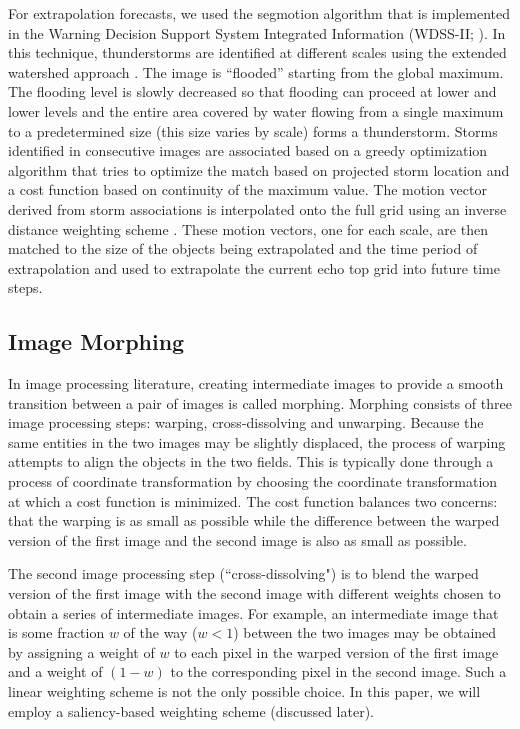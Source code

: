 \documentclass[12pt]{article}
\begin{document}
For extrapolation forecasts, we used the segmotion algorithm that is implemented in the Warning Decision Support System Integrated Information (WDSS-II; \citealt{lak++06}). 
In this technique, thunderstorms are identified at different scales using the extended watershed approach \citep{lak09eff}. The image is ``flooded'' starting from the global maximum. The flooding level is slowly decreased so that flooding can proceed at lower and lower levels and the entire area covered by water flowing from a single maximum to a predetermined size (this size varies by scale) forms a thunderstorm. Storms identified in consecutive images are associated based on a greedy optimization algorithm \citep{lak10object} that tries to optimize the match based on projected storm location and a cost function based on continuity of the maximum value. The motion vector derived from storm associations is interpolated onto the full grid using an inverse distance weighting scheme \citep{lak++03}. These motion vectors, one for each scale, are then matched to the size of the objects being extrapolated and the time period of extrapolation and used to extrapolate the current echo top grid into future time steps.

\subsection{Image Morphing}
In image processing literature, creating intermediate images
to provide a smooth transition between a pair of images is called
morphing. Morphing consists of three image processing steps:
warping, cross-dissolving and unwarping. Because the same entities in the
two images may be slightly displaced,
the process of warping attempts to align the objects in the two
fields. This is typically done through a process of coordinate
transformation by choosing the coordinate transformation at which
a cost function is minimized. The cost function balances two concerns:
that the warping is as small as possible while the difference between
the warped version of the first image and the second image is also as
small as possible.

The second image processing step (``cross-dissolving") is to blend
the warped version of the first image with the second image with different
weights chosen to obtain a series of intermediate images. For example,
an intermediate image that is some fraction $w$ of the way ($w < 1$) between the
two images may be obtained by assigning a weight of $w$
to each pixel in the warped version of the first image and a weight of $(1-w)$
to the corresponding pixel in the second image. Such a linear weighting scheme is not the only possible choice.  In this paper, we will employ a saliency-based weighting scheme (discussed later).
\end{document}
